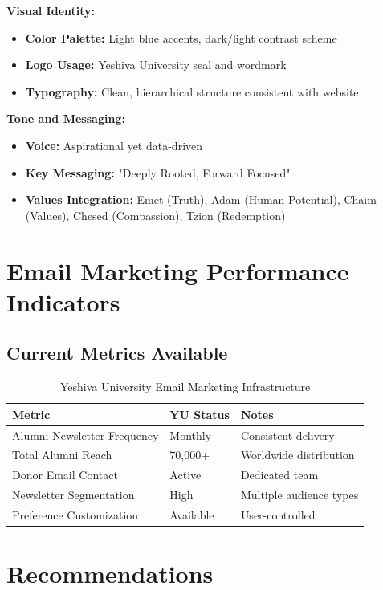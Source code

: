 \documentclass[12pt,letterpaper]{article}
\begin{document}
\textbf{Visual Identity:}
\begin{itemize}[leftmargin=*]
    \item \textbf{Color Palette:} Light blue accents, dark/light contrast scheme
    \item \textbf{Logo Usage:} Yeshiva University seal and wordmark
    \item \textbf{Typography:} Clean, hierarchical structure consistent with website
\end{itemize}

\textbf{Tone and Messaging:}
\begin{itemize}[leftmargin=*]
    \item \textbf{Voice:} Aspirational yet data-driven
    \item \textbf{Key Messaging:} "Deeply Rooted, Forward Focused"
    \item \textbf{Values Integration:} Emet (Truth), Adam (Human Potential), Chaim (Values), Chesed (Compassion), Tzion (Redemption)
\end{itemize}

\section{Email Marketing Performance Indicators}

\subsection{Current Metrics Available}

\begin{table}[h]
\centering
\begin{tabular}{@{}lll@{}}
\toprule
\textbf{Metric} & \textbf{YU Status} & \textbf{Notes} \\
\midrule
Alumni Newsletter Frequency & Monthly & Consistent delivery \\
Total Alumni Reach & 70,000+ & Worldwide distribution \\
Donor Email Contact & Active & Dedicated team \\
Newsletter Segmentation & High & Multiple audience types \\
Preference Customization & Available & User-controlled \\
\bottomrule
\end{tabular}
\caption{Yeshiva University Email Marketing Infrastructure}
\end{table}

\section{Recommendations}
\end{document}
